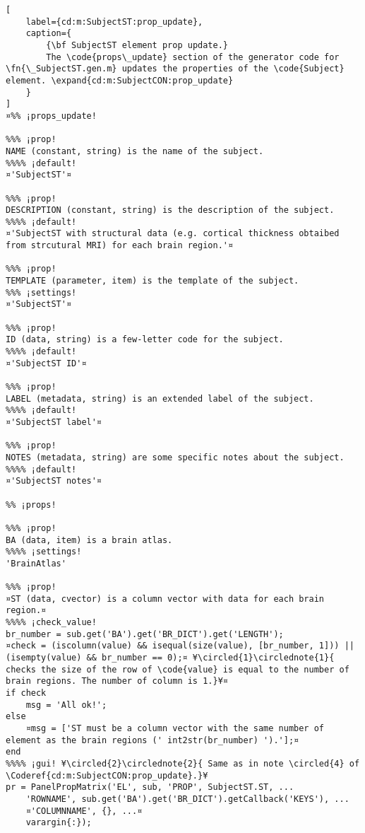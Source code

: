\documentclass{tufte-handout}
\begin{document}
\begin{lstlisting}[
	label={cd:m:SubjectST:prop_update},
	caption={
		{\bf SubjectST element prop update.}
		The \code{props\_update} section of the generator code for \fn{\_SubjectST.gen.m} updates the properties of the \code{Subject} element. \expand{cd:m:SubjectCON:prop_update}
	}
]
¤%% ¡props_update!

%%% ¡prop!
NAME (constant, string) is the name of the subject.
%%%% ¡default!
¤'SubjectST'¤

%%% ¡prop!
DESCRIPTION (constant, string) is the description of the subject.
%%%% ¡default!
¤'SubjectST with structural data (e.g. cortical thickness obtaibed from strcutural MRI) for each brain region.'¤

%%% ¡prop!
TEMPLATE (parameter, item) is the template of the subject.
%%% ¡settings!
¤'SubjectST'¤

%%% ¡prop!
ID (data, string) is a few-letter code for the subject.
%%%% ¡default!
¤'SubjectST ID'¤

%%% ¡prop!
LABEL (metadata, string) is an extended label of the subject.
%%%% ¡default!
¤'SubjectST label'¤

%%% ¡prop!
NOTES (metadata, string) are some specific notes about the subject.
%%%% ¡default!
¤'SubjectST notes'¤

%% ¡props!

%%% ¡prop!
BA (data, item) is a brain atlas.
%%%% ¡settings!
'BrainAtlas'

%%% ¡prop!
¤ST (data, cvector) is a column vector with data for each brain region.¤
%%%% ¡check_value!
br_number = sub.get('BA').get('BR_DICT').get('LENGTH');
¤check = (iscolumn(value) && isequal(size(value), [br_number, 1])) || (isempty(value) && br_number == 0);¤ ¥\circled{1}\circlednote{1}{ checks the size of the row of \code{value} is equal to the number of brain regions. The number of column is 1.}¥¤
if check
    msg = 'All ok!';
else   
    ¤msg = ['ST must be a column vector with the same number of element as the brain regions (' int2str(br_number) ').'];¤
end
%%%% ¡gui! ¥\circled{2}\circlednote{2}{ Same as in note \circled{4} of \Coderef{cd:m:SubjectCON:prop_update}.}¥
pr = PanelPropMatrix('EL', sub, 'PROP', SubjectST.ST, ...
    'ROWNAME', sub.get('BA').get('BR_DICT').getCallback('KEYS'), ...
    ¤'COLUMNNAME', {}, ...¤
    varargin{:});
\end{lstlisting}
\clearpage
\end{document}
